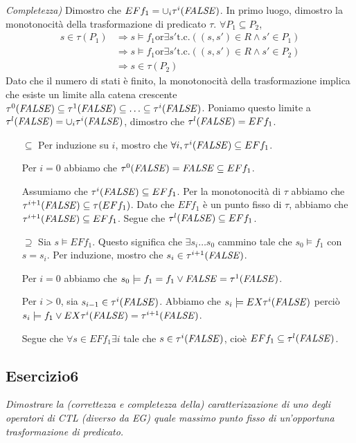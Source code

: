 \documentclass[12pt]{article}
\newcommand{\F}{\ensuremath{\textrm{\emph{FALSE}}}\xspace}
\begin{document}
\medskip

\textit{Completezza)} Dimostro che $EF f_1 = \cup_i \tau^i(\textrm{\F})$.
In primo luogo, dimostro la monotonocità della trasformazione di predicato $\tau$. $\forall P_1 \subseteq P_2$,
\begin{align*}
s\in \tau(P_1) &\Rightarrow s \models f_1 \textrm{or} \exists s' \textrm{t.c.} ((s,s') \in R \land s' \in P_1)\\
               &\Rightarrow s \models f_1 \textrm{or} \exists s' \textrm{t.c.} ((s,s') \in R \land s' \in P_2)\\
			   &\Rightarrow s\in \tau(P_2)
\end{align*}
Dato che il numero di stati è finito, la monotonocità della trasformazione implica che esiste un limite alla catena crescente $\tau^0(\F) \subseteq \tau^1(\F) \subseteq \ldots \subseteq \tau^i(\F)$.
Poniamo questo limite a $\tau^l(\F)=\cup_i \tau^i(\F)$, dimostro che $\tau^l(\F)=EF f_1$.
\begin{itemize}
\item[$\subseteq$] Per induzione su $i$, mostro che $\forall i, \tau^i(\F) \subseteq EF f_1$.

	Per $i=0$ abbiamo che $\tau^0(\F) = \F \subseteq EF f_1$.
	
	Assumiamo che $\tau^i(\F) \subseteq EF f_1$. Per la monotonocità di $\tau$ abbiamo che $\tau^{i+1}(\F) \subseteq \tau(EF f_1)$. Dato che $EF f_1$ è un punto fisso di $\tau$, abbiamo che $\tau^{i+1}(\F) \subseteq EF f_1$. Segue che $\tau^l(\F) \subseteq EF f_1$.
\item[$\supseteq$] Sia $s \models EF f_1$. Questo significa che $\exists s_i \ldots s_0$ cammino tale che $s_0 \models f_1$ con $s = s_i$. Per induzione, mostro che $s_i \in \tau^{i+1}(\F)$.

	Per $i=0$ abbiamo che $s_0 \models f_1 = f_1 \lor \F = \tau^1(\F)$.
	
	Per $i>0$, sia $s_{i-1} \in \tau^i(\F)$. Abbiamo che $s_i \models EX\tau^i(\F)$ perciò $s_i \models f_1 \lor EX\tau^i(\F)=\tau^{i+1}(\F)$.
	
	Segue che $\forall s \in EF f_1 \exists i$ tale che $s \in \tau^i(\F)$, cioè $EF f_1 \subseteq \tau^l(\F)$.
\end{itemize}


\subsection*{Esercizio6}
\textit{Dimostrare la (correttezza e completezza della) caratterizzazione di uno degli operatori di CTL (diverso da EG) quale massimo punto fisso di un'opportuna trasformazione di predicato.}
\end{document}
